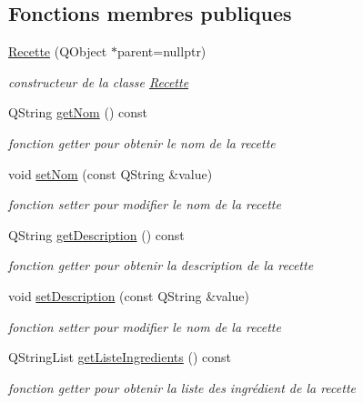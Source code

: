 \subsection*{Fonctions membres publiques}
\begin{DoxyCompactItemize}
\item 
\hyperlink{classRecette_a23c2060e8d97d05f5f9b9178b7efdf65}{Recette} (Q\+Object $\ast$parent=nullptr)
\begin{DoxyCompactList}\small\item\em constructeur de la classe \hyperlink{classRecette}{Recette} \end{DoxyCompactList}\item 
Q\+String \hyperlink{classRecette_afab5d7deab9130137037872a7a42ef3c}{get\+Nom} () const
\begin{DoxyCompactList}\small\item\em fonction getter pour obtenir le nom de la recette \end{DoxyCompactList}\item 
void \hyperlink{classRecette_a8c5387d06e11ecfaf827142146ca0b08}{set\+Nom} (const Q\+String \&value)
\begin{DoxyCompactList}\small\item\em fonction setter pour modifier le nom de la recette \end{DoxyCompactList}\item 
Q\+String \hyperlink{classRecette_a7f3746b691f39d1b468b29819ad3c265}{get\+Description} () const
\begin{DoxyCompactList}\small\item\em fonction getter pour obtenir la description de la recette \end{DoxyCompactList}\item 
void \hyperlink{classRecette_ad8e3af91743c2509d82983f5da803186}{set\+Description} (const Q\+String \&value)
\begin{DoxyCompactList}\small\item\em fonction setter pour modifier le nom de la recette \end{DoxyCompactList}\item 
Q\+String\+List \hyperlink{classRecette_a3ca29579050212dea9da71e9c1f05119}{get\+Liste\+Ingredients} () const
\begin{DoxyCompactList}\small\item\em fonction getter pour obtenir la liste des ingrédient de la recette \end{DoxyCompactList}\item 

\end{DoxyCompactItemize}
